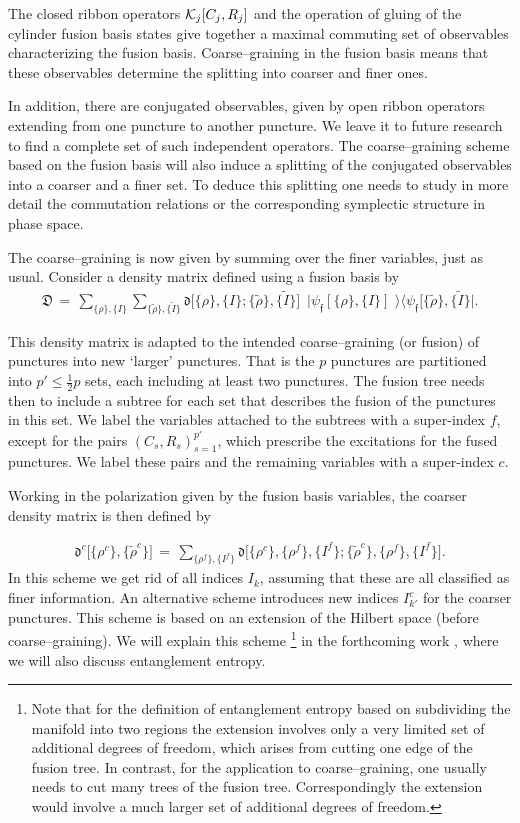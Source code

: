 \documentclass[nofootinbib,superscriptaddress,eqsecnum,tightenlines,11pt]{revtex4-1}
\def\ba{\begin{eqnarray}}
\def\ea{\end{eqnarray}}
\renewcommand{\tilde}{\widetilde}
\def\D{\mathfrak{D}}
\def\d{\mathfrak{d}}
\begin{document}
The closed ribbon operators ${\cal K}_j[C_j,R_j]$ and the operation of gluing of the cylinder fusion basis states give together a maximal commuting set of observables characterizing the fusion basis.  
Coarse--graining in the fusion basis means that these observables determine the splitting into coarser and finer ones. 

In addition, there are conjugated observables, given by open ribbon operators extending from one puncture to another puncture. 
We leave it to future research to find a complete set of such independent operators. 
The coarse--graining scheme based on the fusion basis will also induce a splitting of the conjugated observables into a coarser and a finer set.
To deduce this splitting one needs to study in more detail the commutation relations or the corresponding symplectic structure in phase space. 



The coarse--graining is now given by summing over the finer variables, just as usual.
Consider a density matrix defined using a fusion basis by 
\ba
\D \,=\, \sum_{\{\rho\},\{I\} }    \sum_{\{\tilde \rho\},\{\tilde I\} }    \d \Big[  \{\rho\},\{I\};  \{\tilde\rho\},\{\tilde I\}   \Big]   \,\,\,      \Big|  \psi_{\mathfrak{f}}[\{\rho\},\{I\}] \,\,   \Big \rangle  \Big \langle \psi_{\mathfrak{f}}[\{\tilde \rho\},\{\tilde I\} \Big|.
\ea

This density matrix is adapted to the intended coarse--graining (or fusion) of punctures into new `larger' punctures. That is  the $p$ punctures are partitioned into $p'\leq \tfrac12 p$ sets, each including at least two punctures.  The fusion tree needs then to include a subtree for each set that describes the fusion of the punctures in this set.  We label the variables attached to the subtrees with a super-index $f$, except for the pairs $(C_s,R_s)_{s=1}^{p'}$, which prescribe the excitations for the fused punctures.  We label these pairs and the remaining variables with a super-index $c$.

Working in the polarization given by the fusion basis variables, the coarser density matrix is then defined by

\ba
\d^c\Big[  \{\rho^c\},  \{\tilde \rho^c\} \Big]\,=\,   \sum_{\{\rho^f\}, \{I^f\}} \d\Big[  \{\rho^c\},\{\rho^f\}, \{I^f\};  \{\tilde\rho^c\},\{\rho^f\},\{ I^f\}   \Big]   .
\ea
In this scheme we get rid of all indices $I_k$, assuming that these are all classified as finer information. An alternative scheme introduces new indices $I^c_{k'}$ for the coarser punctures. This scheme is based on an extension of the Hilbert space (before coarse--graining).  We will explain this scheme%
\footnote{Note that for the definition of entanglement entropy based on subdividing the manifold into two regions the extension involves only a very limited set of additional degrees of freedom, which arises from cutting one edge of the fusion tree. In contrast, for the application to coarse--graining, one usually needs to cut many trees of the fusion tree. Correspondingly the extension would involve a much larger set of additional degrees of freedom.} 
in the forthcoming work \cite{Toappear}, where we will also discuss entanglement entropy. 
\end{document}
